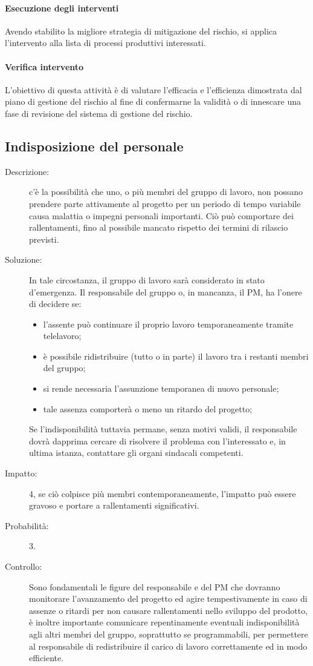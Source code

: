 \paragraph*{Esecuzione degli interventi}
Avendo stabilito la migliore strategia di mitigazione del rischio, si applica l'intervento
alla lista di processi produttivi interessati.

\paragraph*{Verifica intervento}
L'obiettivo di questa attività è di valutare l'efficacia e l'efficienza dimostrata dal piano di
gestione del rischio al fine di confermarne la validità o di innescare una fase di revisione
del sistema di gestione del rischio.


\subsection{Indisposizione del personale} 
\begin{description}
\item[Descrizione:]c'è la possibilità che uno, o più membri del gruppo di lavoro, non possano prendere parte attivamente al progetto per un periodo di tempo variabile causa malattia o impegni personali importanti. Ciò può comportare dei rallentamenti, fino al possibile mancato rispetto dei termini di rilascio previsti.
\item[Soluzione:] In tale circostanza, il gruppo di lavoro sarà considerato in stato d'emergenza. Il responsabile del gruppo o, in mancanza, il PM, ha l'onere di decidere se:
	\begin{itemize}
	\item l'assente può continuare il proprio lavoro temporaneamente tramite telelavoro;
	\item è possibile ridistribuire (tutto o in parte) il lavoro tra i restanti membri del gruppo;
	\item si rende necessaria l'assunzione temporanea di nuovo personale;
	\item tale assenza comporterà o meno un ritardo del progetto;
	\end{itemize}
Se l'indisponibilità tuttavia permane, senza motivi validi, il responsabile dovrà dapprima cercare di risolvere il problema con l'interessato e, in ultima istanza, contattare gli organi sindacali competenti.
\item[Impatto:] 4, se ciò colpisce più membri contemporaneamente, l'impatto può essere gravoso e portare a rallentamenti significativi.
\item[Probabilità:] 3.
\item[Controllo:] Sono fondamentali le figure del responsabile e del PM che dovranno monitorare l'avanzamento del progetto ed agire tempestivamente in caso di assenze o ritardi per non causare rallentamenti nello sviluppo del prodotto, è inoltre importante comunicare repentinamente eventuali indisponibilità agli altri membri del gruppo, soprattutto se programmabili, per permettere al responsabile di redistribuire il carico di lavoro correttamente ed in modo efficiente.
\end{description}


